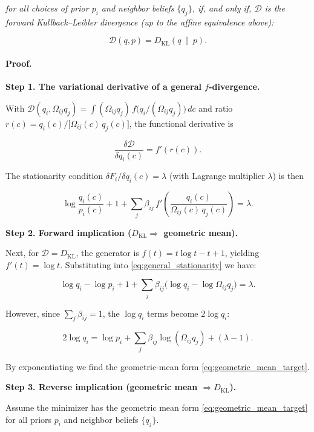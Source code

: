 \documentclass[twoside,11pt]{article}
\begin{document}
\textit{for all choices of prior $p_i$ and neighbor beliefs $\{q_j\}$, if, and only if, $\mathcal{D}$ is the forward Kullback--Leibler divergence (up to the affine equivalence above):}

\[
\mathcal{D}(q,p) = D_{\mathrm{KL}}(q\,\|\,p).
\]

\paragraph{Proof.}

\textbf{Step 1.  The variational derivative of a general $f$-divergence.}

With $\mathcal{D}(q_i,\Omega_{ij}q_j)=\int (\Omega_{ij}q_j)\,f\!\bigl(q_i/(\Omega_{ij}q_j)\bigr)\,dc$ and ratio $r(c)=q_i(c)/\bigl[\Omega_{ij}(c)\,q_j(c)\bigr]$, the functional derivative is

\begin{equation}
\frac{\delta\mathcal{D}}{\delta q_i(c)} = f'(r(c)).
\end{equation}

The stationarity condition $\delta F_i/\delta q_i(c)=\lambda$ (with Lagrange multiplier $\lambda$) is then

\begin{equation}
\log\frac{q_i(c)}{p_i(c)} + 1
+ \sum_j \beta_{ij}\,f'\!\!\left(\frac{q_i(c)}{\Omega_{ij}(c)\,q_j(c)}\right) = \lambda.
\label{eq:general_stationarity}
\end{equation}

\textbf{Step 2.  Forward implication ($D_{\mathrm{KL}}\Rightarrow$ geometric mean).}

Next, for $\mathcal{D}=D_{\mathrm{KL}}$, the generator is $f(t)=t\log t - t + 1$, yielding $f'(t)=\log t$.  Substituting into \eqref{eq:general_stationarity} we have:

\[
\log q_i - \log p_i + 1 + \sum_j \beta_{ij}\bigl(\log q_i - \log\Omega_{ij}q_j\bigr) = \lambda.
\]

However, since $\sum_j\beta_{ij}=1$, the $\log q_i$ terms become $2\log q_i$:

\[
2\log q_i = \log p_i + \sum_j\beta_{ij}\log(\Omega_{ij}q_j) + (\lambda - 1).
\]

By exponentiating we find the geometric-mean form \eqref{eq:geometric_mean_target}. 

\textbf{Step 3.  Reverse implication (geometric mean $\Rightarrow D_{\mathrm{KL}}$).}

Assume the minimizer has the geometric mean form \eqref{eq:geometric_mean_target} for all priors $p_i$ and neighbor beliefs $\{q_j\}$.  
\end{document}
